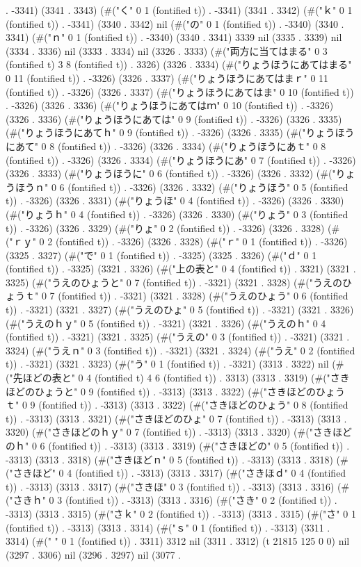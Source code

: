. -3341) (3341 . 3343) (#("く" 0 1 (fontified t)) . -3341) (3341 . 3342) (#("ｋ" 0 1 (fontified t)) . -3341) (3340 . 3342) nil (#("の" 0 1 (fontified t)) . -3340) (3340 . 3341) (#("ｎ" 0 1 (fontified t)) . -3340) (3340 . 3341) 3339 nil (3335 . 3339) nil (3334 . 3336) nil (3333 . 3334) nil (3326 . 3333) (#("両方に当てはまる" 0 3 (fontified t) 3 8 (fontified t)) . 3326) (3326 . 3334) (#("りょうほうにあてはまる" 0 11 (fontified t)) . -3326) (3326 . 3337) (#("りょうほうにあてはまｒ" 0 11 (fontified t)) . -3326) (3326 . 3337) (#("りょうほうにあてはま" 0 10 (fontified t)) . -3326) (3326 . 3336) (#("りょうほうにあてはｍ" 0 10 (fontified t)) . -3326) (3326 . 3336) (#("りょうほうにあては" 0 9 (fontified t)) . -3326) (3326 . 3335) (#("りょうほうにあてｈ" 0 9 (fontified t)) . -3326) (3326 . 3335) (#("りょうほうにあて" 0 8 (fontified t)) . -3326) (3326 . 3334) (#("りょうほうにあｔ" 0 8 (fontified t)) . -3326) (3326 . 3334) (#("りょうほうにあ" 0 7 (fontified t)) . -3326) (3326 . 3333) (#("りょうほうに" 0 6 (fontified t)) . -3326) (3326 . 3332) (#("りょうほうｎ" 0 6 (fontified t)) . -3326) (3326 . 3332) (#("りょうほう" 0 5 (fontified t)) . -3326) (3326 . 3331) (#("りょうほ" 0 4 (fontified t)) . -3326) (3326 . 3330) (#("りょうｈ" 0 4 (fontified t)) . -3326) (3326 . 3330) (#("りょう" 0 3 (fontified t)) . -3326) (3326 . 3329) (#("りょ" 0 2 (fontified t)) . -3326) (3326 . 3328) (#("ｒｙ" 0 2 (fontified t)) . -3326) (3326 . 3328) (#("ｒ" 0 1 (fontified t)) . -3326) (3325 . 3327) (#("で" 0 1 (fontified t)) . -3325) (3325 . 3326) (#("ｄ" 0 1 (fontified t)) . -3325) (3321 . 3326) (#("上の表と" 0 4 (fontified t)) . 3321) (3321 . 3325) (#("うえのひょうと" 0 7 (fontified t)) . -3321) (3321 . 3328) (#("うえのひょうｔ" 0 7 (fontified t)) . -3321) (3321 . 3328) (#("うえのひょう" 0 6 (fontified t)) . -3321) (3321 . 3327) (#("うえのひょ" 0 5 (fontified t)) . -3321) (3321 . 3326) (#("うえのｈｙ" 0 5 (fontified t)) . -3321) (3321 . 3326) (#("うえのｈ" 0 4 (fontified t)) . -3321) (3321 . 3325) (#("うえの" 0 3 (fontified t)) . -3321) (3321 . 3324) (#("うえｎ" 0 3 (fontified t)) . -3321) (3321 . 3324) (#("うえ" 0 2 (fontified t)) . -3321) (3321 . 3323) (#("う" 0 1 (fontified t)) . -3321) (3313 . 3322) nil (#("先ほどの表と" 0 4 (fontified t) 4 6 (fontified t)) . 3313) (3313 . 3319) (#("さきほどのひょうと" 0 9 (fontified t)) . -3313) (3313 . 3322) (#("さきほどのひょうｔ" 0 9 (fontified t)) . -3313) (3313 . 3322) (#("さきほどのひょう" 0 8 (fontified t)) . -3313) (3313 . 3321) (#("さきほどのひょ" 0 7 (fontified t)) . -3313) (3313 . 3320) (#("さきほどのｈｙ" 0 7 (fontified t)) . -3313) (3313 . 3320) (#("さきほどのｈ" 0 6 (fontified t)) . -3313) (3313 . 3319) (#("さきほどの" 0 5 (fontified t)) . -3313) (3313 . 3318) (#("さきほどｎ" 0 5 (fontified t)) . -3313) (3313 . 3318) (#("さきほど" 0 4 (fontified t)) . -3313) (3313 . 3317) (#("さきほｄ" 0 4 (fontified t)) . -3313) (3313 . 3317) (#("さきほ" 0 3 (fontified t)) . -3313) (3313 . 3316) (#("さきｈ" 0 3 (fontified t)) . -3313) (3313 . 3316) (#("さき" 0 2 (fontified t)) . -3313) (3313 . 3315) (#("さｋ" 0 2 (fontified t)) . -3313) (3313 . 3315) (#("さ" 0 1 (fontified t)) . -3313) (3313 . 3314) (#("ｓ" 0 1 (fontified t)) . -3313) (3311 . 3314) (#(" " 0 1 (fontified t)) . 3311) 3312 nil (3311 . 3312) (t 21815 125 0 0) nil (3297 . 3306) nil (3296 . 3297) nil (3077 . 